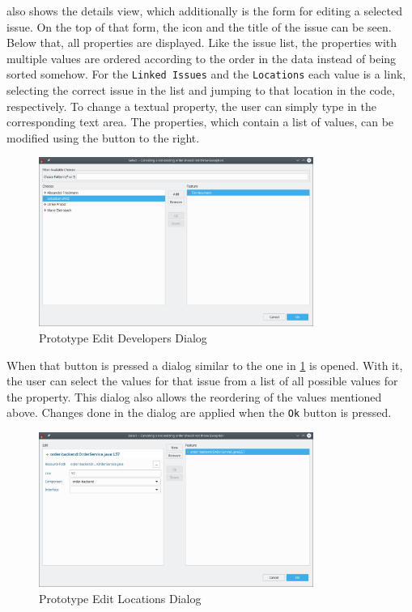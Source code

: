  also shows the details view, which additionally is the form for editing a selected issue.
On the top of that form, the icon and the title of the issue can be seen.
Below that, all properties are displayed.
Like the issue list, the properties with multiple values are ordered according to the order in the data instead of being sorted somehow.
For the \lstinline|Linked Issues| and the \lstinline|Locations| each value is a link, 
selecting the correct issue in the list and jumping to that location in the code, respectively.
To change a textual property, the user can simply type in the corresponding text area.
The properties, which contain a list of values, can be modified using the button to the right.

\begin{figure}[!h]
	\centering
	\includegraphics[width=0.8\textwidth]{graphics/screenshot_gropius_ei_edit_list.png}
	\caption{Prototype Edit Developers Dialog}
	\label{fig:c4:screenshot_edit_list}
\end{figure}

When that button is pressed a dialog similar to the one in \cref{fig:c4:screenshot_edit_list} is opened.
With it, the user can select the values for that issue from a list of all possible values for the property.
This dialog also allows the reordering of the values mentioned above.
Changes done in the dialog are applied when the \lstinline|Ok| button is pressed.

\begin{figure}[!h]
	\centering
	\includegraphics[width=0.8\textwidth]{graphics/screenshot_gropius_ei_edit_locations.png}
	\caption{Prototype Edit Locations Dialog}
	\label{fig:c4:screenshot_edit_locations}
\end{figure}

